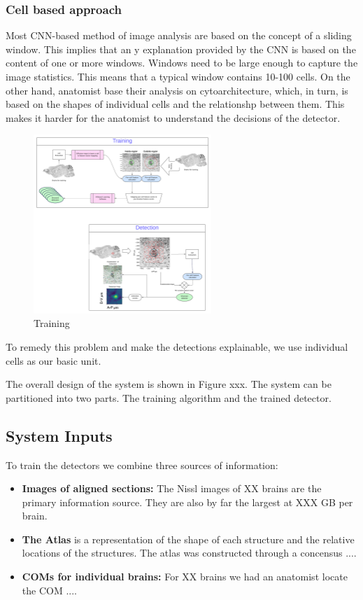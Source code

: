\documentclass[runningheads]{llncs}
\begin{document}
\subsubsection{Cell based approach}  Most CNN-based method of image
analysis are based on the concept of a sliding window. This implies
that an
y explanation provided by the CNN is based on the content of one or more windows. Windows need to be large enough to capture the image statistics. This means that a typical window contains 10-100 cells.
On the other hand, anatomist base their analysis on cytoarchitecture, which, in turn, is based on the shapes of individual cells and the relationshp between them. This makes it harder for the anatomist to understand the decisions of the detector.
\begin{figure}
  \centering
  \includegraphics[width=0.6\textwidth]{figures/Training.pdf}
  \caption{Training \label{fig:training}}
\end{figure}

To remedy this problem and make the detections explainable, we use individual cells as our basic unit. 

The overall design of the system is shown in Figure xxx. The system can be partitioned into two parts. The training algorithm and the trained detector.

\subsection{System Inputs}
To train the detectors we combine three sources of information:
\begin{itemize}
    \item {\bf Images of aligned sections:} The Nissl images of XX brains are the primary information source. They are also by far the largest at XXX GB per brain.
    \item {\bf The Atlas} is a representation of the shape of each structure and the relative locations of the structures. The atlas was constructed through a concensus ....
    \item {\bf COMs for individual brains:} For XX brains we had an anatomist locate the COM ....
\end{itemize}
\end{document}
